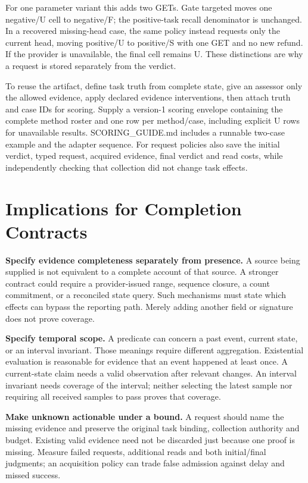 \documentclass[11pt]{article}
\begin{document}
For one parameter variant this adds two GETs. Gate targeted moves one negative/U cell to negative/F; the positive-task recall denominator is unchanged. In a recovered missing-head case, the same policy instead requests only the current head, moving positive/U to positive/S with one GET and no new refund. If the provider is unavailable, the final cell remains U. These distinctions are why a request is stored separately from the verdict.

To reuse the artifact, define task truth from complete state, give an assessor only the allowed evidence, apply declared evidence interventions, then attach truth and case IDs for scoring. Supply a version-1 scoring envelope containing the complete method roster and one row per method/case, including explicit U rows for unavailable results. SCORING\_GUIDE.md includes a runnable two-case example and the adapter sequence. For request policies also save the initial verdict, typed request, acquired evidence, final verdict and read costs, while independently checking that collection did not change task effects.

\section{Implications for Completion Contracts}
\textbf{Specify evidence completeness separately from presence.} A source being supplied is not equivalent to a complete account of that source. A stronger contract could require a provider-issued range, sequence closure, a count commitment, or a reconciled state query. Such mechanisms must state which effects can bypass the reporting path. Merely adding another field or signature does not prove coverage.

\textbf{Specify temporal scope.} A predicate can concern a past event, current state, or an interval invariant. Those meanings require different aggregation. Existential evaluation is reasonable for evidence that an event happened at least once. A current-state claim needs a valid observation after relevant changes. An interval invariant needs coverage of the interval; neither selecting the latest sample nor requiring all received samples to pass proves that coverage.

\textbf{Make unknown actionable under a bound.} A request should name the missing evidence and preserve the original task binding, collection authority and budget. Existing valid evidence need not be discarded just because one proof is missing. Measure failed requests, additional reads and both initial/final judgments; an acquisition policy can trade false admission against delay and missed success.
\end{document}
